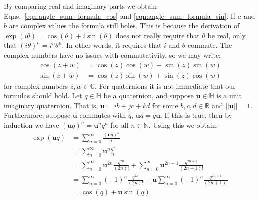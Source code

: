 \documentclass{article}
\theoremstyle{plain}
\theoremstyle{normal}
\begin{document}
            By comparing real and imaginary parts we obtain
            Eqns.~\ref{eqn:angle_sum_formula_cos} and
            \ref{eqn:angle_sum_formula_sin}. If $a$ and $b$ are complex
            values the formula still holes. This is because the derivation
            of $\exp(i\theta)=\cos(\theta)+i\sin(\theta)$ does not really
            require that $\theta$ be real, only that
            $(i\theta)^{n}=i^{n}\theta^{n}$. In other words, it requires that
            $i$ and $\theta$ commute. The complex numbers have no issues with
            commutativity, so we may write:
            \begin{align}
                \label{eqn:angle_sum_formula_complex_cos}
                \cos(z+w)&=\cos(z)\cos(w)-\sin(z)\sin(w)\\
                \label{eqn:angle_sum_formula_complex_sin}
                \sin(z+w)&=\cos(z)\sin(w)+\sin(z)\cos(w)
            \end{align}
            for complex numbers $z,w\in\mathbb{C}$. For quaternions it is not
            immediate that our formulas should hold. Let $q\in\mathbb{H}$ be
            a quaternion, and suppose $\mathbf{u}\in\mathbb{H}$ is a unit
            imaginary quaternion. That is,
            $\mathbf{u}=ib+jc+kd$ for some $b,c,d\in\mathbb{R}$ and
            $||\mathbf{u}||=1$. Furthermore, suppose $\mathbf{u}$ commutes with
            $q$, $\mathbf{u}q=q\mathbf{u}$. If this is true, then by induction
            we have $(\mathbf{u}q)^{n}=\mathbf{u}^{n}q^{n}$ for all
            $n\in\mathbb{N}$. Using this we obtain:
            \begin{subequations}
                \begin{align}
                    \exp(\mathbf{u}q)
                    &=\sum_{n=0}^{\infty}\frac{(\mathbf{u}q)^{n}}{n!}\\
                    &=\sum_{n=0}^{\infty}\mathbf{u}^{n}\frac{q^{n}}{n!}\\
                    &=\sum_{n=0}^{\infty}\mathbf{u}^{2n}\frac{q^{2n}}{(2n)!}
                        +\sum_{n=0}^{\infty}
                        \mathbf{u}^{2n+1}\frac{q^{2n+1}}{(2n+1)!}\\
                    &=\sum_{n=0}^{\infty}(-1)^{n}\frac{q^{2n}}{(2n)!}
                        +\mathbf{u}
                        \sum_{n=0}^{\infty}(-1)^{n}\frac{q^{2n+1}}{(2n+1)!}\\
                    &=\cos(q)+\mathbf{u}\sin(q)
                \end{align}
            \end{subequations}
\end{document}
